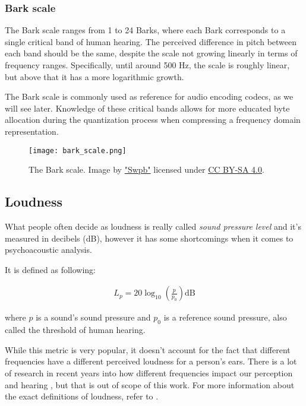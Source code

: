 \subsubsection{Bark scale}
The Bark scale ranges from 1 to 24 Barks, where each Bark corresponds to a single critical band of human hearing. \cite{fastl_2006} The perceived difference in pitch between each band should be the same, despite the scale not growing linearly in terms of frequency ranges. Specifically, until around 500 Hz, the scale is roughly linear, but above that it has a more logarithmic growth. \cite{hermes_filter}

The Bark scale is commonly used as reference for audio encoding codecs, as we will see later. Knowledge of these critical bands allows for more educated byte allocation during the quantization process when compressing a frequency domain representation.

\begin{figure}[ht]
	\caption[Bark scale]{The Bark scale. Image by \href{https://commons.wikimedia.org/wiki/User:Swpb}{"Swpb"} licensed under \href{https://creativecommons.org/licenses/by-sa/4.0/deed.en}{CC BY-SA 4.0}.}
	\centering
	\texttt{[image: bark\_scale.png]}
\end{figure}

\subsection{Loudness}
What people often decide as loudness is really called \emph{sound pressure level} and it's measured in decibels (dB), however it has some shortcomings when it comes to psychoacoustic analysis.

It is defined as following: \cite{behar_1984}

\begin{align}
L_p = 20 \log_{10} \left( \frac{p}{p_0} \right) \text{dB}
\end{align}

where $p$ is a sound's sound pressure and $p_0$ is a reference sound pressure, also called the threshold of human hearing.

While this metric is very popular, it doesn't account for the fact that different frequencies have a different perceived loudness for a person's ears. \cite{olson1967music} There is a lot of research in recent years into how different frequencies impact our perception and hearing \cite{kuwano_1989}, but that is out of scope of this work. For more information about the exact definitions of loudness, refer to \cite{olson1967music}.

